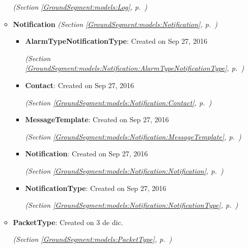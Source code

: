 \begin{itemize}
\begin{itemize}
  \textit{(Section \ref{GroundSegment:models:Log}, p.~\pageref{GroundSegment:models:Log})}

    \item \textbf{Notification}
  \textit{(Section \ref{GroundSegment:models:Notification}, p.~\pageref{GroundSegment:models:Notification})}

      \begin{itemize}
    \setlength{\parskip}{0ex}
        \item \textbf{AlarmTypeNotificationType}: Created on Sep 27, 2016



  \textit{(Section \ref{GroundSegment:models:Notification:AlarmTypeNotificationType}, p.~\pageref{GroundSegment:models:Notification:AlarmTypeNotificationType})}

        \item \textbf{Contact}: Created on Sep 27, 2016



  \textit{(Section \ref{GroundSegment:models:Notification:Contact}, p.~\pageref{GroundSegment:models:Notification:Contact})}

        \item \textbf{MessageTemplate}: Created on Sep 27, 2016



  \textit{(Section \ref{GroundSegment:models:Notification:MessageTemplate}, p.~\pageref{GroundSegment:models:Notification:MessageTemplate})}

        \item \textbf{Notification}: Created on Sep 27, 2016



  \textit{(Section \ref{GroundSegment:models:Notification:Notification}, p.~\pageref{GroundSegment:models:Notification:Notification})}

        \item \textbf{NotificationType}: Created on Sep 27, 2016



  \textit{(Section \ref{GroundSegment:models:Notification:NotificationType}, p.~\pageref{GroundSegment:models:Notification:NotificationType})}

      \end{itemize}
    \item \textbf{PacketType}: Created on 3 de dic.



  \textit{(Section \ref{GroundSegment:models:PacketType}, p.~\pageref{GroundSegment:models:PacketType})}


\end{itemize}
\end{itemize}
